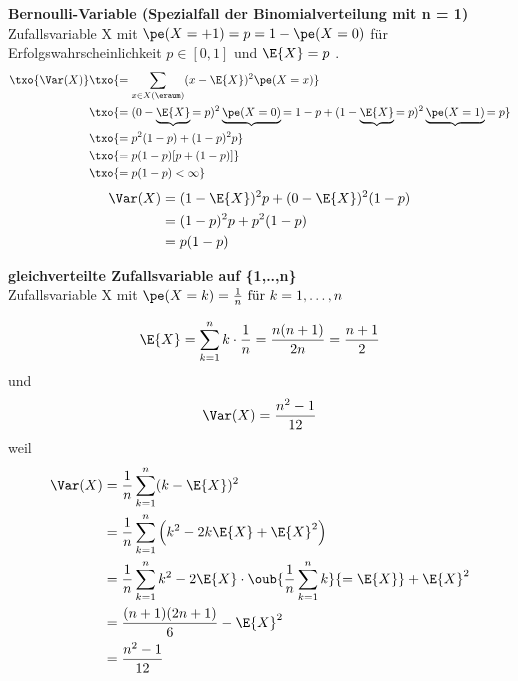 \begin{bsp}
    \textbf{Bernoulli-Variable (Spezialfall der Binomialverteilung mit n = 1)}   \\
    Zufallsvariable X mit $\pe(X = +1) = p = 1 - \pe(X=0)$ für Erfolgswahrscheinlichkeit $p \in [0,1]$ und $\E{X} = p$
    . \\
    \begin{align*}
        \txo{\Var(X)} & \txo{= \sum_{x\in X(\eraum)}  (x - \E{X})^2 \pe(X=x)} \\
        &
        \txo{ = (0 - \underbrace{\E{X}}{=p})^2  \underbrace{\pe(X=0)}{=1-p} + (1 - \underbrace{\E{X}}{=p})^2  \underbrace{\pe(X=1)}{=p}} \\
        & \txo{ = p^2 (1-p) + (1-p)^2 p } \\
        & \txo{= p(1-p) [p+(1-p)]} \\
        & \txo{= p(1-p) < \infty}
    \end{align*}
    \begin{align*}
        \Var(X)
        & = (1 - \E{X})^2 p + (0 - \E{X})^2 (1 - p) \\
        & = (1 - p)^2 p + p^2 (1 - p) \\
        & = p(1 - p)
    \end{align*}
\end{bsp}

\begin{bsp}
    \textbf{gleichverteilte Zufallsvariable auf \{1,..,n\}}   \\
    Zufallsvariable X mit $\pe(X = k) = \frac{1}{n} \text{ für } k = 1, \dots, n$

    \[
        \E{X}
        = \sum_{k=1}^{n} k \cdot \frac{1}{n}
        = \frac{n(n+1)}{2n}
        = \frac{n+1}{2}
    \]
    und
    \[
        \Var(X) = \frac{n^2 - 1}{12}
    \]
    weil
    \begin{align*}
        \Var(X)
        &= \frac{1}{n} \sum_{k=1}^{n} (k - \E{X})^2 \\
        &= \frac{1}{n} \sum_{k=1}^{n} \left( k^2 - 2k\E{X} + \E{X}^2\right) \\
        &= \frac{1}{n} \sum_{k=1}^{n} k^2 - 2\E{X} \cdot \oub{\frac{1}{n} \sum_{k=1}^{n} k}{=\E{X}} + \E{X}^2 \\
        &= \frac{(n+1)(2n+1)}{6} - \E{X}^2 \\
        &= \frac{n^2 - 1}{12}
    \end{align*}
\end{bsp}

